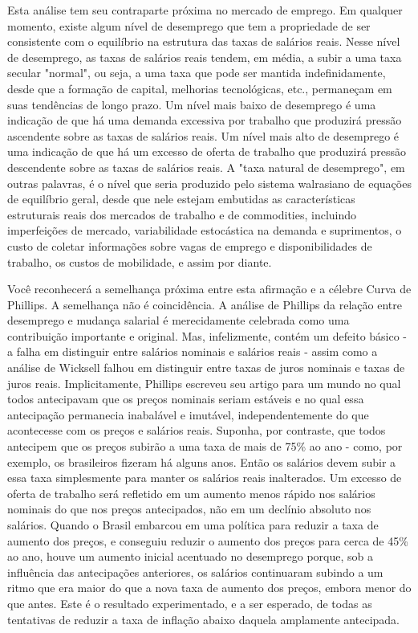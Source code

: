 \documentclass[12pt]{article}
\begin{document}
Esta análise tem seu contraparte próxima no mercado de emprego. Em qualquer momento, existe algum nível de desemprego que tem a propriedade de ser consistente com o equilíbrio na estrutura das taxas de salários reais. Nesse nível de desemprego, as taxas de salários reais tendem, em média, a subir a uma taxa secular "normal", ou seja, a uma taxa que pode ser mantida indefinidamente, desde que a formação de capital, melhorias tecnológicas, etc., permaneçam em suas tendências de longo prazo. Um nível mais baixo de desemprego é uma indicação de que há uma demanda excessiva por trabalho que produzirá pressão ascendente sobre as taxas de salários reais. Um nível mais alto de desemprego é uma indicação de que há um excesso de oferta de trabalho que produzirá pressão descendente sobre as taxas de salários reais. A "taxa natural de desemprego", em outras palavras, é o nível que seria produzido pelo sistema walrasiano de equações de equilíbrio geral, desde que nele estejam embutidas as características estruturais reais dos mercados de trabalho e de commodities, incluindo imperfeições de mercado, variabilidade estocástica na demanda e suprimentos, o custo de coletar informações sobre vagas de emprego e disponibilidades de trabalho, os custos de mobilidade, e assim por diante.

Você reconhecerá a semelhança próxima entre esta afirmação e a célebre Curva de Phillips. A semelhança não é coincidência. A análise de Phillips da relação entre desemprego e mudança salarial é merecidamente celebrada como uma contribuição importante e original. Mas, infelizmente, contém um defeito básico - a falha em distinguir entre salários nominais e salários reais - assim como a análise de Wicksell falhou em distinguir entre taxas de juros nominais e taxas de juros reais. Implicitamente, Phillips escreveu seu artigo para um mundo no qual todos antecipavam que os preços nominais seriam estáveis e no qual essa antecipação permanecia inabalável e imutável, independentemente do que acontecesse com os preços e salários reais. Suponha, por contraste, que todos antecipem que os preços subirão a uma taxa de mais de 75\% ao ano - como, por exemplo, os brasileiros fizeram há alguns anos. Então os salários devem subir a essa taxa simplesmente para manter os salários reais inalterados. Um excesso de oferta de trabalho será refletido em um aumento menos rápido nos salários nominais do que nos preços antecipados, não em um declínio absoluto nos salários. Quando o Brasil embarcou em uma política para reduzir a taxa de aumento dos preços, e conseguiu reduzir o aumento dos preços para cerca de 45\% ao ano, houve um aumento inicial acentuado no desemprego porque, sob a influência das antecipações anteriores, os salários continuaram subindo a um ritmo que era maior do que a nova taxa de aumento dos preços, embora menor do que antes. Este é o resultado experimentado, e a ser esperado, de todas as tentativas de reduzir a taxa de inflação abaixo daquela amplamente antecipada.
\end{document}
